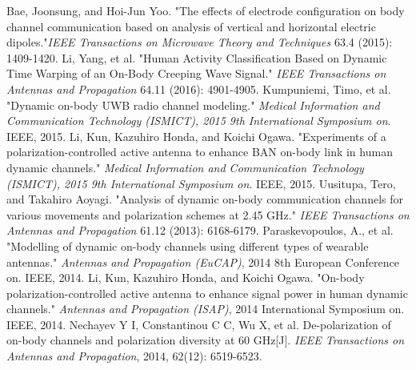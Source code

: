 \documentclass[conference]{IEEEtran}
\begin{document}
\begin{thebibliography}{1}

Bae, Joonsung, and Hoi-Jun Yoo. "The effects of electrode configuration on body channel communication based on analysis of vertical and horizontal electric dipoles."\emph{IEEE Transactions on Microwave Theory and Techniques} 63.4 (2015): 1409-1420.
Li, Yang, et al. "Human Activity Classification Based on Dynamic Time Warping of an On-Body Creeping Wave Signal." \emph{IEEE Transactions on Antennas and Propagation} 64.11 (2016): 4901-4905.
Kumpuniemi, Timo, et al. "Dynamic on-body UWB radio channel modeling." \emph{Medical Information and Communication Technology (ISMICT), 2015 9th International Symposium on}. IEEE, 2015.
Li, Kun, Kazuhiro Honda, and Koichi Ogawa. "Experiments of a polarization-controlled active antenna to enhance BAN on-body link in human dynamic channels." \emph{Medical Information and Communication Technology (ISMICT), 2015 9th International Symposium on}. IEEE, 2015.
Uusitupa, Tero, and Takahiro Aoyagi. "Analysis of dynamic on-body communication channels for various movements and polarization schemes at 2.45 GHz." \emph{IEEE Transactions on Antennas and Propagation} 61.12 (2013): 6168-6179.
Paraskevopoulos, A., et al. "Modelling of dynamic on-body channels using different types of wearable antennas." \emph{Antennas and Propagation (EuCAP)}, 2014 8th European Conference on. IEEE, 2014.
Li, Kun, Kazuhiro Honda, and Koichi Ogawa. "On-body polarization-controlled active antenna to enhance signal power in human dynamic channels." \emph{Antennas and Propagation (ISAP)}, 2014 International Symposium on. IEEE, 2014.
Nechayev Y I, Constantinou C C, Wu X, et al. De-polarization of on-body channels and polarization diversity at 60 GHz[J]. \emph{IEEE Transactions on Antennas and Propagation}, 2014, 62(12): 6519-6523.
\end{thebibliography}




\end{document}
